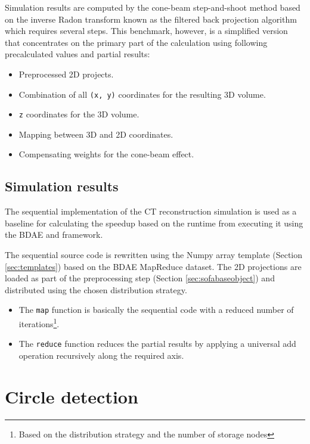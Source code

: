 \noindent
Simulation results are computed by the cone-beam step-and-shoot method based on the inverse Radon transform known as the filtered back projection algorithm which requires several steps. This benchmark, however, is a simplified version that concentrates on the primary part of the calculation using following precalculated values and partial results:

\begin{itemize}
	\item Preprocessed 2D projects.
	\item Combination of all \texttt{(x, y)} coordinates for the resulting 3D volume.
	\item \texttt{z} coordinates for the 3D volume.
	\item Mapping between 3D and 2D coordinates.
	\item Compensating weights for the cone-beam effect.
\end{itemize}

\subsection*{Simulation results}
The sequential implementation of the CT reconstruction simulation is used as a baseline for calculating the speedup based on the runtime from executing it using the BDAE and \CodeName framework.
\newpage

The sequential source code is rewritten using the Numpy array template (Section \ref{sec:templates}) based on the BDAE MapReduce dataset. The 2D projections are loaded as part of the preprocessing step (Section \ref{sec:sofabaseobject}) and distributed using the chosen distribution strategy.

\begin{itemize}
	\item The \texttt{map} function is basically the sequential code with a reduced number of iterations\footnote{Based on the distribution strategy and the number of storage nodes}.
	\item The \texttt{reduce} function reduces the partial results by applying a universal add operation recursively along the required axis.
\end{itemize}

\section{Circle detection}
